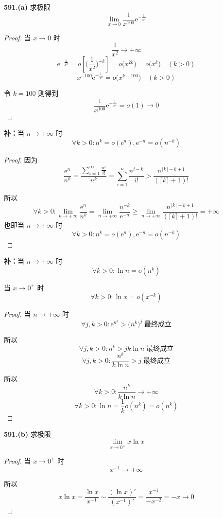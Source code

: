 \textbf{591.(a)} 求极限
\[\lim_{x \rightarrow 0} \frac{1}{x^{100}} \mathrm{e}^{-\frac{1}{x^2}}\]
\begin{proof}
    当 $x \rightarrow 0$ 时
    \[\frac{1}{x^2} \rightarrow +\infty\]
    \[\mathrm{e}^{-\frac{1}{x^2}} = o\left[\biggl(\frac{1}{x^2}\biggr)^{-k}\right] = o\bigl(x^{2k}\bigr) = o\bigl(x^k\bigr) \quad (k>0)\]
    \[x^{-100}\mathrm{e}^{-\frac{1}{x^2}} = o\bigl(x^{k-100}\bigr) \quad (k>0)\]

    令 $k = 100$ 则得到
    \[\frac{1}{x^{100}} \mathrm{e}^{-\frac{1}{x^2}} = o(1) \rightarrow 0\]
\end{proof}

\textbf{补：}当 $n \rightarrow +\infty$ 时
\[\forall k > 0: n^k = o(\mathrm{e}^n), \mathrm{e}^{-n} = o(n^{-k})\]
\begin{proof}
    因为
    \[\frac{\mathrm{e}^n}{n^k} = \frac{\displaystyle \sum_{i=1}^{\infty} \frac{n^i}{i!}}{n^k} = \sum_{i=1}^{n} \frac{n^{i-k}}{i!} > \frac{n^{\lceil k \rceil - k+1}}{(\lceil k \rceil+1)!}\]

    所以
    \[\forall k > 0: \lim_{n \rightarrow +\infty} \frac{\mathrm{e}^n}{n^k} = \lim_{n \rightarrow +\infty} \frac{n^{-k}}{\mathrm{e}^{-n}} \geqslant \lim_{n \rightarrow +\infty} \frac{n^{\lceil k \rceil - k+1}}{(\lceil k \rceil+1)!} = +\infty\]
    也即当 $n \rightarrow +\infty$ 时
    \[\forall k > 0: n^k = o(\mathrm{e}^n), \mathrm{e}^{-n} = o(n^{-k})\]
\end{proof}

\textbf{补：}当 $n \rightarrow +\infty$ 时
\[\forall k > 0: \ln n = o(n^k)\]

当 $x \rightarrow 0^+$ 时
\[\forall k > 0: \ln x = o(x^{-k})\]
\begin{proof}
    当 $n \rightarrow +\infty$ 时
    \[\forall j,k > 0: \mathrm{e}^{n^k} > \bigl(n^k\bigr)^j \;\text{最终成立}\]

    所以
    \[\forall j,k > 0: n^k > jk\ln n \;\text{最终成立}\]
    \[\forall j,k > 0: \frac{n^k}{k\ln n} > j \;\text{最终成立}\]

    所以
    \[\forall k > 0: \frac{n^k}{k\ln n} \rightarrow +\infty\]
    \[\forall k > 0: \ln n = \frac{1}{k} o(n^k) = o(n^k)\]
\end{proof}
\vspace{9pt}

\textbf{591.(b)} 求极限
\[\lim_{x \rightarrow 0^+} x\ln x\]

\begin{proof}
    当 $x \rightarrow 0^+$ 时
    \[x^{-1} \rightarrow +\infty\]
    
    所以
    \[x \ln x = \frac{\ln x}{x^{-1}} \sim \frac{(\ln x)'}{(x^{-1})'} = \frac{x^{-1}}{-x^{-2}} = -x \rightarrow 0\]
\end{proof}\vspace{9pt}

